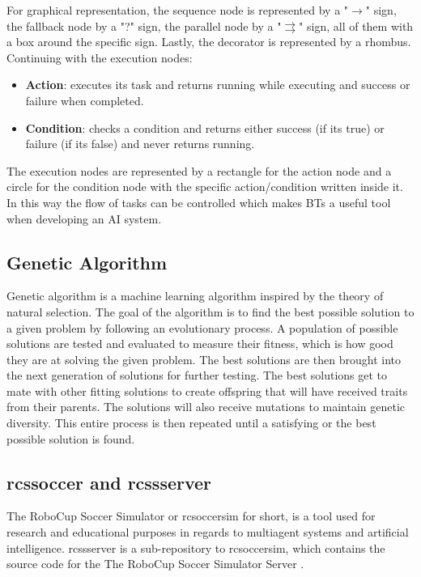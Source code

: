 For graphical representation, the sequence node is represented by a "$\rightarrow$" sign, the fallback node by a "?" sign, the parallel node by a "$\rightrightarrows$" sign, all of them with a box around the specific sign. Lastly, the decorator is represented by a rhombus.
Continuing with the execution nodes:
\begin{itemize}
    \item \textbf{Action}: executes its task and returns running while executing and success or failure when completed.
    \item \textbf{Condition}: checks a condition and returns either success (if its true) or failure (if its false) and never returns running. 
\end{itemize} 
The execution nodes are represented by a rectangle for the action node and a circle for the condition node with the specific action/condition written inside it.
In this way the flow of tasks can be controlled which makes BTs a useful tool when developing an AI system\cite{BTsinAI}. 

\subsection{Genetic Algorithm}
Genetic algorithm is a machine learning algorithm inspired by the theory of natural selection. The goal of the algorithm is to find the best possible solution to a given problem by following an evolutionary process. A population of possible solutions are tested and evaluated to measure their fitness, which is how good they are at solving the given problem. The best solutions are then brought into the next generation of solutions for further testing. The best solutions get to mate with other fitting solutions to create offspring that will have received traits from their parents. The solutions will also receive mutations to maintain genetic diversity. This entire process is then repeated until a satisfying or the best possible solution is found\cite{BiscontiniGA}.

\subsection{rcssoccer and rcssserver}
The RoboCup Soccer Simulator or rcsoccersim for short, is a tool used for research and educational purposes in regards to multiagent systems and artificial intelligence. rcssserver is a sub-repository to rcsoccersim, which contains the source code for the The RoboCup Soccer Simulator Server \cite{rcsoccersim1}.

